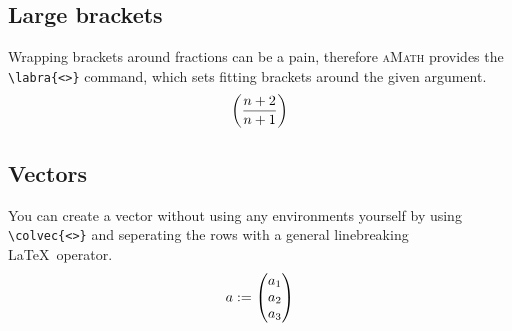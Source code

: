 \documentclass{ctext}
\begin{document}
\subsection{Large brackets}
Wrapping brackets around fractions can be a pain, therefore \textsc{aMath} provides the \verb|\labra{<>}| command, which sets fitting brackets around the given argument.
\[
  \left(\frac{n+2}{n+1}\right)
\]
\subsection{Vectors}
You can create a vector without using any environments yourself by using \verb|\colvec{<>}| and seperating the rows with a general linebreaking \LaTeX\ operator.
\[
  a := \begin{pmatrix}a_1\\a_2\\a_3\end{pmatrix}
\]
\end{document}

